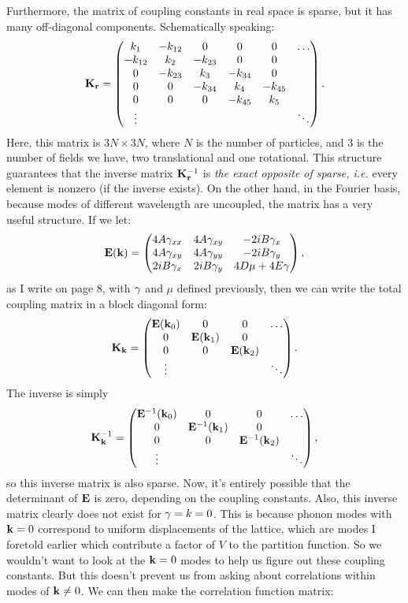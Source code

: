 \documentclass[12pt]{article}
\begin{document}
Furthermore, the matrix of coupling constants in real space is sparse, but it has many off-diagonal components. Schematically speaking:
\[ \mathbf{K}_{\mathbf{r}} = \left(\begin{matrix} k_1 & - k_{12} & 0 & 0 & 0 & \ldots \\ -k_{12} & k_2 & -k_{23} & 0 & 0 & \\ 0 & -k_{23} & k_3 & -k_{34} & 0 & \\ 0 & 0 & -k_{34} & k_4 & -k_{45} & \\ 0 & 0 & 0 & -k_{45} & k_5 & \\ \vdots & & & & & \ddots \end{matrix}\right).\]
Here, this matrix is $3N\times 3N$, where $N$ is the number of particles, and 3 is the number of fields we have, two translational and one rotational. This structure guarantees that the inverse matrix $\mathbf{K}_{\mathbf{r}}^{-1}$ is \emph{the exact opposite of sparse, i.e.} every element is nonzero (if the inverse exists). On the other hand, in the Fourier basis, because modes of different wavelength are uncoupled, the matrix has a very useful structure. If we let:
\[ \mathbf{E}(\mathbf{k}) = \left(\begin{matrix}4A \gamma_{xx} & 4A \gamma_{xy} & -2i B \gamma_{x} \\ 4A 
\gamma_{xy} & 4A\gamma_{yy} & - 2i B \gamma_{y} \\ 2i B \gamma_{x} & 2i B\gamma_{y} & 4D 
\mu + 4 E \gamma\end{matrix}\right),\]
as I write on page 8, with $\gamma$ and $\mu$ defined previously, then we can write the total coupling matrix in a block diagonal form:
\[ \mathbf{K}_{\mathbf{k}} = \left(\begin{matrix}\mathbf{E}(\mathbf{k}_0) & 0 & 0 & \ldots \\ 0 & \mathbf{E}(\mathbf{k}_1) & 0 & \\ 0 & 0 & \mathbf{E}(\mathbf{k}_2) & \\ \vdots & & & \ddots\end{matrix}\right).\]
The inverse is simply
\[ \mathbf{K}^{-1}_{\mathbf{k}} = \left(\begin{matrix}\mathbf{E}^{-1}(\mathbf{k}_0) & 0 & 0 & \ldots \\ 0 & \mathbf{E}^{-1}(\mathbf{k}_1) & 0 & \\ 0 & 0 & \mathbf{E}^{-1}(\mathbf{k}_2) & \\ \vdots & & & \ddots\end{matrix}\right),\]
so this inverse matrix is also sparse. Now, it's entirely possible that the determinant of $\mathbf{E}$ is zero, depending on the coupling constants. Also, this inverse matrix clearly does not exist for $\gamma=k = 0$. This is because phonon modes with $\mathbf{k} = 0$ correspond to uniform displacements of the lattice, which are modes I foretold earlier which contribute a factor of $V$ to the partition function. So we wouldn't want to look at the $\mathbf{k}  =  0$ modes to help us figure out these coupling constants. But this doesn't prevent us from asking about correlations within modes of $\mathbf{k} \neq 0$. We can then make the correlation function matrix:
\end{document}

